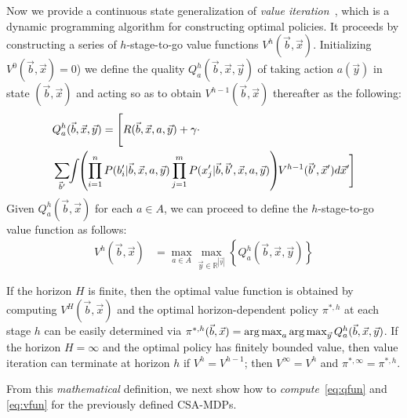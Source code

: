 Now we provide a continuous state generalization of {\it value
iteration}~\cite{bellman}, which is a dynamic programming algorithm
for constructing optimal policies.  It proceeds by constructing a
series of $h$-stage-to-go value functions $V^h(\vec{b},\vec{x})$.
Initializing $V^0(\vec{b},\vec{x}) = 0$) we define the quality
$Q_a^{h}(\vec{b},\vec{x},\vec{y})$ of taking action $a(\vec{y})$ in state
$(\vec{b},\vec{x})$ and acting so as to obtain
$V^{h-1}(\vec{b},\vec{x})$ thereafter as the following:
\vspace{-4mm}
{\footnotesize
\begin{align}
& Q_a^{h}(\vec{b},\vec{x},\vec{y}) = \Bigg[ R(\vec{b},\vec{x},a,\vec{y}) + \gamma \cdot \label{eq:qfun} \\ 
& \sum_{\vec{b}'} \hspace{-1.0mm} \int \hspace{-1.0mm} \left( \prod_{i=1}^n P(b_i'|\vec{b},\vec{x},a,\vec{y}) \prod_{j=1}^m P(x_j'|\vec{b},\vec{b}',\vec{x},a,\vec{y}) \right) \hspace{-1.0mm} V^{h-1}(\vec{b}',\vec{x}') d\vec{x}'  \hspace{-0.2mm} \Bigg] \nonumber
\end{align}}
Given $Q_a^h(\vec{b},\vec{x})$ for each $a \in A$, we can proceed
to define the $h$-stage-to-go value function as follows:
\begin{align}
V^{h}(\vec{b},\vec{x}) & = \max_{a \in A} \max_{\vec{y} \in \mathbb{R}^{|\vec{y}|}} \left\{ Q^{h}_a(\vec{b},\vec{x},\vec{y}) \right\} \label{eq:vfun}
\end{align}

If the horizon $H$ is finite, then the optimal value function is
obtained by computing $V^H(\vec{b},\vec{x})$ and the optimal
horizon-dependent policy $\pi^{*,h}$ at each stage $h$ can be easily
determined via $\pi^{*,h}(\vec{b},\vec{x}) = \argmax_a
\argmax_{\vec{y}} Q^h_a(\vec{b},\vec{x},\vec{y})$.  If the horizon $H
= \infty$ and the optimal policy has finitely bounded value, then
value iteration can terminate at horizon $h$ if $V^{h} = V^{h-1}$;
then $V^\infty = V^h$ and $\pi^{*,\infty} = \pi^{*,h}$.

From this \emph{mathematical} definition, we next 
show how to \emph{compute}~\eqref{eq:qfun} and \eqref{eq:vfun} 
for the previously defined CSA-MDPs.

